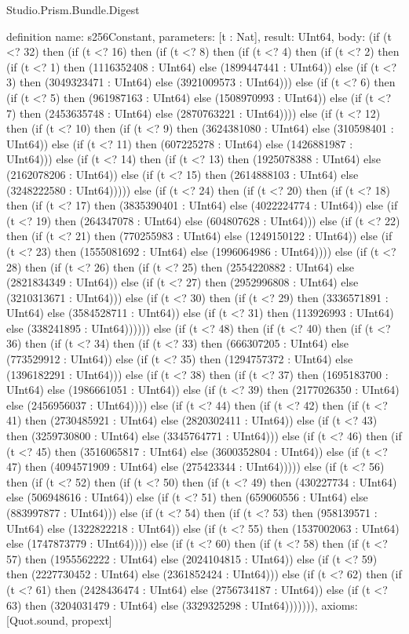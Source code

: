 \begin{lexlean}{Studio.Prism.Bundle.Digest}
\begin{semanticmodule}
definition{
  name: s256Constant,
  parameters: [t : Nat],
  result: UInt64,
  body: (if (t <? 32) then (if (t <? 16) then (if (t <? 8) then (if (t <? 4) then (if (t <? 2) then (if (t <? 1) then (1116352408 : UInt64) else (1899447441 : UInt64)) else (if (t <? 3) then (3049323471 : UInt64) else (3921009573 : UInt64))) else (if (t <? 6) then (if (t <? 5) then (961987163 : UInt64) else (1508970993 : UInt64)) else (if (t <? 7) then (2453635748 : UInt64) else (2870763221 : UInt64)))) else (if (t <? 12) then (if (t <? 10) then (if (t <? 9) then (3624381080 : UInt64) else (310598401 : UInt64)) else (if (t <? 11) then (607225278 : UInt64) else (1426881987 : UInt64))) else (if (t <? 14) then (if (t <? 13) then (1925078388 : UInt64) else (2162078206 : UInt64)) else (if (t <? 15) then (2614888103 : UInt64) else (3248222580 : UInt64))))) else (if (t <? 24) then (if (t <? 20) then (if (t <? 18) then (if (t <? 17) then (3835390401 : UInt64) else (4022224774 : UInt64)) else (if (t <? 19) then (264347078 : UInt64) else (604807628 : UInt64))) else (if (t <? 22) then (if (t <? 21) then (770255983 : UInt64) else (1249150122 : UInt64)) else (if (t <? 23) then (1555081692 : UInt64) else (1996064986 : UInt64)))) else (if (t <? 28) then (if (t <? 26) then (if (t <? 25) then (2554220882 : UInt64) else (2821834349 : UInt64)) else (if (t <? 27) then (2952996808 : UInt64) else (3210313671 : UInt64))) else (if (t <? 30) then (if (t <? 29) then (3336571891 : UInt64) else (3584528711 : UInt64)) else (if (t <? 31) then (113926993 : UInt64) else (338241895 : UInt64)))))) else (if (t <? 48) then (if (t <? 40) then (if (t <? 36) then (if (t <? 34) then (if (t <? 33) then (666307205 : UInt64) else (773529912 : UInt64)) else (if (t <? 35) then (1294757372 : UInt64) else (1396182291 : UInt64))) else (if (t <? 38) then (if (t <? 37) then (1695183700 : UInt64) else (1986661051 : UInt64)) else (if (t <? 39) then (2177026350 : UInt64) else (2456956037 : UInt64)))) else (if (t <? 44) then (if (t <? 42) then (if (t <? 41) then (2730485921 : UInt64) else (2820302411 : UInt64)) else (if (t <? 43) then (3259730800 : UInt64) else (3345764771 : UInt64))) else (if (t <? 46) then (if (t <? 45) then (3516065817 : UInt64) else (3600352804 : UInt64)) else (if (t <? 47) then (4094571909 : UInt64) else (275423344 : UInt64))))) else (if (t <? 56) then (if (t <? 52) then (if (t <? 50) then (if (t <? 49) then (430227734 : UInt64) else (506948616 : UInt64)) else (if (t <? 51) then (659060556 : UInt64) else (883997877 : UInt64))) else (if (t <? 54) then (if (t <? 53) then (958139571 : UInt64) else (1322822218 : UInt64)) else (if (t <? 55) then (1537002063 : UInt64) else (1747873779 : UInt64)))) else (if (t <? 60) then (if (t <? 58) then (if (t <? 57) then (1955562222 : UInt64) else (2024104815 : UInt64)) else (if (t <? 59) then (2227730452 : UInt64) else (2361852424 : UInt64))) else (if (t <? 62) then (if (t <? 61) then (2428436474 : UInt64) else (2756734187 : UInt64)) else (if (t <? 63) then (3204031479 : UInt64) else (3329325298 : UInt64))))))),
  axioms: [Quot.sound, propext]
}


\end{semanticmodule}
\end{lexlean}
